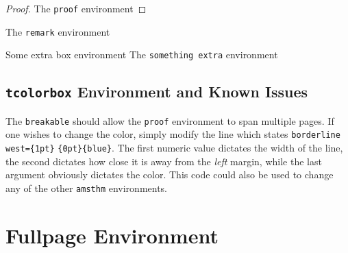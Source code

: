 \documentclass[]{subook}
\begin{document}
\begin{proof}
    The \texttt{proof} environment
\end{proof}


\begin{remark}
    The \texttt{remark} environment
\end{remark}


\begin{tbox}{Some extra box environment}
    The \texttt{something extra} environment
\end{tbox}


\subsection{\texttt{tcolorbox} Environment and Known Issues}
\label{ssub:tcolorbox environments_and_known_issues}


The \texttt{breakable} should allow the \texttt{proof} environment to span multiple pages. If one wishes to change the color, simply modify the line which states \texttt{borderline west=\{1pt\}} \texttt{\{0pt\}\{blue\}}. The first numeric value dictates the width of the line, the second dictates how close it is away from the \textit{left} margin, while the last argument obviously dictates the color. This code could also be used to change any of the other \texttt{amsthm} environments.


\section{Fullpage Environment}\label{Sec: Fullpage}
\end{document}
